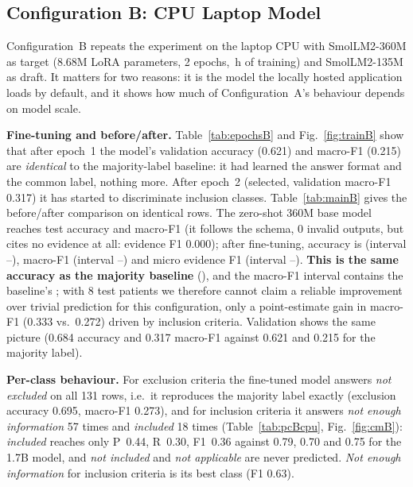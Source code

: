 \subsection{Configuration B: CPU Laptop Model}
\label{sec:cpu}
Configuration~B repeats the experiment on the laptop CPU with SmolLM2-360M as target (8.68M LoRA parameters, 2 epochs, \TTrainHours{}\,h of training) and SmolLM2-135M as draft. It matters for two reasons: it is the model the locally hosted application loads by default, and it shows how much of Configuration~A's behaviour depends on model scale.

\textbf{Fine-tuning and before/after.} Table~\ref{tab:epochsB} and Fig.~\ref{fig:trainB} show that after epoch~1 the model's validation accuracy (0.621) and macro-F1 (0.215) are \emph{identical} to the majority-label baseline: it had learned the answer format and the common label, nothing more. After epoch~2 (selected, validation macro-F1 0.317) it has started to discriminate inclusion classes. Table~\ref{tab:mainB} gives the before/after comparison on identical rows. The zero-shot 360M base model reaches test accuracy \BaseAcc{} and macro-F1 \BaseMF{} (it follows the schema, 0 invalid outputs, but cites no evidence at all: evidence F1 0.000); after fine-tuning, accuracy is \TestAcc{} (interval \TestAccLo--\TestAccHi), macro-F1 \TestMF{} (interval \TestMFLo--\TestMFHi) and micro evidence F1 \TestEvF{} (interval \TestEvFLo--\TestEvFHi). \textbf{This is the same accuracy as the majority baseline} (\MajAcc{}), and the macro-F1 interval contains the baseline's \MajMF{}; with 8 test patients we therefore cannot claim a reliable improvement over trivial prediction for this configuration, only a point-estimate gain in macro-F1 (0.333 vs.\ 0.272) driven by inclusion criteria. Validation shows the same picture (0.684 accuracy and 0.317 macro-F1 against 0.621 and 0.215 for the majority label).

\textbf{Per-class behaviour.} For exclusion criteria the fine-tuned model answers \emph{not excluded} on all 131 rows, i.e.\ it reproduces the majority label exactly (exclusion accuracy 0.695, macro-F1 0.273), and for inclusion criteria it answers \emph{not enough information} 57 times and \emph{included} 18 times (Table~\ref{tab:pcBcpu}, Fig.~\ref{fig:cmB}): \emph{included} reaches only P~0.44, R~0.30, F1~0.36 against 0.79, 0.70 and 0.75 for the 1.7B model, and \emph{not included} and \emph{not applicable} are never predicted. \emph{Not enough information} for inclusion criteria is its best class (F1 0.63).

